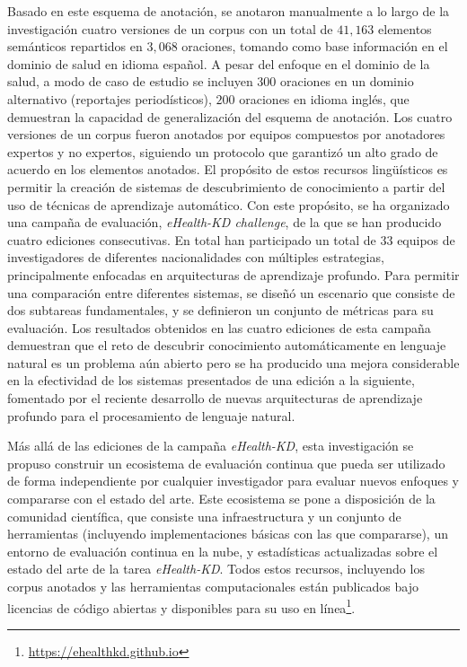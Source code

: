 Basado en este esquema de anotación, se anotaron manualmente a lo largo de la investigación cuatro versiones de un corpus con un total de $41,163$ elementos semánticos repartidos en $3,068$ oraciones, tomando como base información en el dominio de salud en idioma español. A pesar del enfoque en el dominio de la salud, a modo de caso de estudio se incluyen $300$ oraciones en un dominio alternativo (reportajes periodísticos), $200$ oraciones en idioma inglés, que demuestran la capacidad de generalización del esquema de anotación. Los cuatro versiones de un corpus fueron anotados por equipos compuestos por anotadores expertos y no expertos, siguiendo un protocolo que garantizó un alto grado de acuerdo en los elementos anotados.
El propósito de estos recursos lingüísticos es permitir la creación de sistemas de descubrimiento de conocimiento a partir del uso de técnicas de aprendizaje automático.
Con este propósito, se ha organizado una campaña de evaluación, \textit{eHealth-KD challenge}, de la que se han producido cuatro ediciones consecutivas. En total han participado un total de $33$ equipos de investigadores de diferentes nacionalidades con múltiples estrategias, principalmente enfocadas en arquitecturas de aprendizaje profundo. Para permitir una comparación entre diferentes sistemas, se diseñó un escenario que consiste de dos subtareas fundamentales, y se definieron un conjunto de métricas para su evaluación.
Los resultados obtenidos en las cuatro ediciones de esta campaña demuestran que el reto de descubrir conocimiento automáticamente en lenguaje natural es un problema aún abierto pero se ha producido una mejora considerable en la efectividad de los sistemas presentados de una edición a la siguiente, fomentado por el reciente desarrollo de nuevas arquitecturas de aprendizaje profundo para el procesamiento de lenguaje natural.

Más allá de las ediciones de la campaña \textit{eHealth-KD}, esta investigación se propuso construir un ecosistema de evaluación continua que pueda ser utilizado de forma independiente por cualquier investigador para evaluar nuevos enfoques y compararse con el estado del arte.
Este ecosistema se pone a disposición de la comunidad científica, que consiste una infraestructura y un conjunto de herramientas (incluyendo implementaciones básicas con las que compararse), un entorno de evaluación continua en la nube, y estadísticas actualizadas sobre el estado del arte de la tarea \textit{eHealth-KD}.
Todos estos recursos, incluyendo los corpus anotados y las herramientas computacionales están publicados bajo licencias de código abiertas y disponibles para su uso en línea\footnote{\url{https://ehealthkd.github.io}}.

